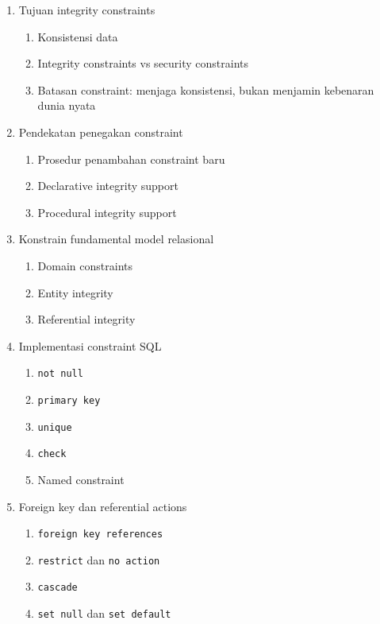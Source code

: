 \begin{enumerate}
    \item \pwajib Tujuan integrity constraints
    \begin{enumerate}
        \item \pwajib Konsistensi data
        \item \pwajib Integrity constraints vs security constraints
        \item \ppaham Batasan constraint: menjaga konsistensi, bukan menjamin kebenaran dunia nyata
    \end{enumerate}
    \item \pwajib Pendekatan penegakan constraint
    \begin{enumerate}
        \item \pwajib Prosedur penambahan constraint baru
        \item \pwajib Declarative integrity support
        \item \ppaham Procedural integrity support
    \end{enumerate}
    \item \pwajib Konstrain fundamental model relasional
    \begin{enumerate}
        \item \pwajib Domain constraints
        \item \pwajib Entity integrity
        \item \pwajib Referential integrity
    \end{enumerate}
    \item \pwajib Implementasi constraint SQL
    \begin{enumerate}
        \item \pwajib \texttt{not null}
        \item \pwajib \texttt{primary key}
        \item \pwajib \texttt{unique}
        \item \pwajib \texttt{check}
        \item \ppaham Named constraint
    \end{enumerate}
    \item \pwajib Foreign key dan referential actions
    \begin{enumerate}
        \item \pwajib \texttt{foreign key references}
        \item \pwajib \texttt{restrict} dan \texttt{no action}
        \item \pwajib \texttt{cascade}
        \item \pwajib \texttt{set null} dan \texttt{set default}

\end{enumerate}
\end{enumerate}
